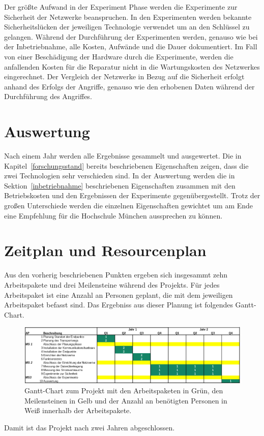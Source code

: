 Der größte Aufwand in der Experiment Phase werden die Experimente zur Sicherheit der Netzwerke beanspruchen.
In den Experimenten werden bekannte Sicherheitslücken der jeweiligen Technologie verwendet um an den Schlüssel zu gelangen.
Während der Durchführung der Experimenten werden, genauso wie bei der Inbetriebnahme, alle Kosten, Aufwände und die Dauer dokumentiert.
Im Fall von einer Beschädigung der Hardware durch die Experimente, werden die anfallenden Kosten für die Reparatur nicht in die Wartungskosten des Netzwerkes eingerechnet.
Der Vergleich der Netzwerke in Bezug auf die Sicherheit erfolgt anhand des Erfolgs der Angriffe, genauso wie den erhobenen Daten während der Durchführung des Angriffes.

\section{Auswertung}

Nach einem Jahr werden alle Ergebnisse gesammelt und ausgewertet.
Die in Kapitel~\ref{forschungsstand} bereits beschriebenen Eigenschaften zeigen, dass die zwei Technologien sehr verschieden sind.
In der Auswertung werden die in Sektion~\ref{inbetriebnahme} beschriebenen Eigenschaften zusammen mit den Betriebskosten und den Ergebnissen der Experimente gegenübergestellt.
Trotz der großen Unterschiede werden die einzelnen Eigenschaften gewichtet um am Ende eine Empfehlung für die Hochschule München aussprechen zu können.

\section{Zeitplan und Resourcenplan}

Aus den vorherig beschriebenen Punkten ergeben sich insgesammt zehn Arbeitspakete und drei Meilensteine während des Projekts.
Für jedes Arbeitspaket ist eine Anzahl an Personen geplant, die mit dem jeweiligen Arbeitspaket befasst sind.
Das Ergebniss aus dieser Planung ist folgendes Gantt-Chart.

\begin{figure}[htbp] 
  \centering
     \includegraphics[width=1\textwidth]{img/gannt.png}
     \caption{Gantt-Chart zum Projekt mit den Arbeitspaketen in Grün, den Meilensteinen in Gelb und der Anzahl an benötigten Personen in Weiß innerhalb der Arbeitspakete.}
     \label{fig:gantt}
\end{figure}

Damit ist das Projekt nach zwei Jahren abgeschlossen.

